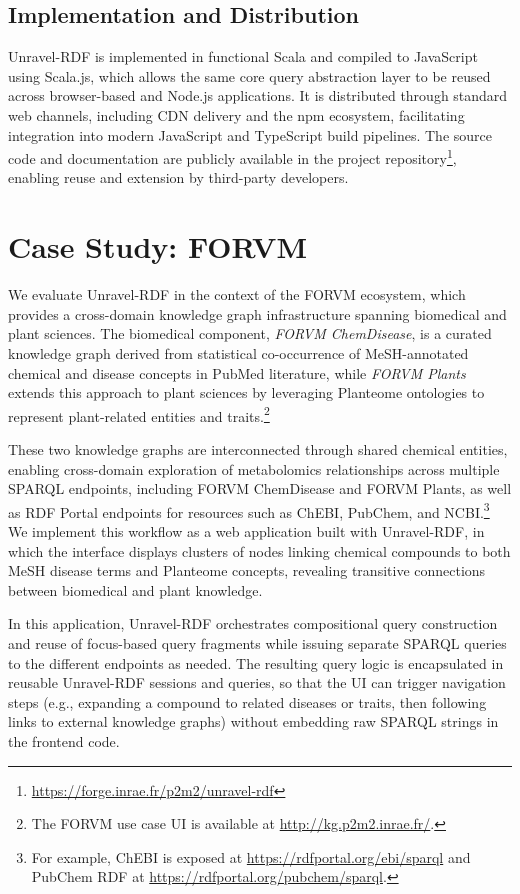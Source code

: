 \documentclass[
]{ceurart}
\begin{document}
\subsection{Implementation and Distribution}

Unravel-RDF is implemented in functional Scala and compiled to
JavaScript using Scala.js, which allows the same core query abstraction
layer to be reused across browser-based and Node.js applications. It is
distributed through standard web channels, including CDN delivery and
the npm ecosystem, facilitating integration into modern JavaScript and
TypeScript build pipelines. The source code and documentation are
publicly available in the project repository\footnote{\url{https://forge.inrae.fr/p2m2/unravel-rdf}},
enabling reuse and extension by third-party developers.

\section{Case Study: FORVM}

We evaluate Unravel-RDF in the context of the FORVM ecosystem, which
provides a cross-domain knowledge graph infrastructure spanning
biomedical and plant sciences. The biomedical component, \textit{FORVM
ChemDisease}, is a curated knowledge graph derived from statistical
co-occurrence of MeSH-annotated chemical and disease concepts in PubMed
literature, while \textit{FORVM Plants} extends this approach to plant
sciences by leveraging Planteome ontologies to represent plant-related
entities and traits.\footnote{The FORVM use case UI is available at
\url{http://kg.p2m2.inrae.fr/}.}

These two knowledge graphs are interconnected through shared chemical
entities, enabling cross-domain exploration of metabolomics
relationships across multiple SPARQL endpoints, including FORVM
ChemDisease and FORVM Plants, as well as RDF Portal endpoints for
resources such as ChEBI, PubChem, and NCBI.\footnote{For example, ChEBI
is exposed at \url{https://rdfportal.org/ebi/sparql} and PubChem RDF at
\url{https://rdfportal.org/pubchem/sparql}.} We implement this workflow
as a web application built with Unravel-RDF, in which the interface
displays clusters of nodes linking chemical compounds to both MeSH
disease terms and Planteome concepts, revealing transitive connections
between biomedical and plant knowledge.

In this application, Unravel-RDF orchestrates compositional query
construction and reuse of focus-based query fragments while issuing
separate SPARQL queries to the different endpoints as needed. The
resulting query logic is encapsulated in reusable Unravel-RDF sessions and
queries, so that the UI can trigger navigation steps (e.g., expanding a
compound to related diseases or traits, then following links to external
knowledge graphs) without embedding raw SPARQL strings in the frontend
code.
\end{document}
